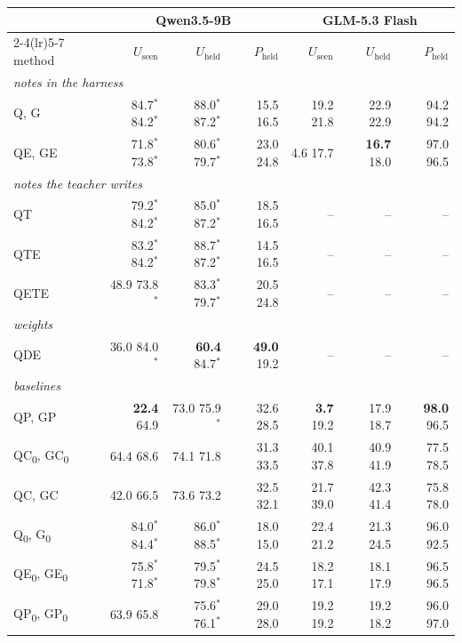 \begin{tabular}{lrrrrrr}
\toprule
 & \multicolumn{3}{c}{Qwen3.5-9B} & \multicolumn{3}{c}{GLM-5.3 Flash} \\
\cmidrule(lr){2-4}\cmidrule(lr){5-7}
method & $U_{\mathrm{seen}}$ & $U_{\mathrm{held}}$ & $P_{\mathrm{held}}$ & $U_{\mathrm{seen}}$ & $U_{\mathrm{held}}$ & $P_{\mathrm{held}}$ \\
\midrule
\multicolumn{7}{l}{\emph{notes in the harness}} \\
Q, G & 84.7$^{*}$ {\tiny 84.2$^{*}$} & 88.0$^{*}$ {\tiny 87.2$^{*}$} & 15.5 {\tiny 16.5} & 19.2 {\tiny 21.8} & 22.9 {\tiny 22.9} & 94.2 {\tiny 94.2} \\
QE, GE & 71.8$^{*}$ {\tiny 73.8$^{*}$} & 80.6$^{*}$ {\tiny 79.7$^{*}$} & 23.0 {\tiny 24.8} & 4.6 {\tiny 17.7} & \textbf{16.7} {\tiny 18.0} & 97.0 {\tiny 96.5} \\
\midrule
\multicolumn{7}{l}{\emph{notes the teacher writes}} \\
QT & 79.2$^{*}$ {\tiny 84.2$^{*}$} & 85.0$^{*}$ {\tiny 87.2$^{*}$} & 18.5 {\tiny 16.5} & -- & -- & -- \\
QTE & 83.2$^{*}$ {\tiny 84.2$^{*}$} & 88.7$^{*}$ {\tiny 87.2$^{*}$} & 14.5 {\tiny 16.5} & -- & -- & -- \\
QETE & 48.9 {\tiny 73.8$^{*}$} & 83.3$^{*}$ {\tiny 79.7$^{*}$} & 20.5 {\tiny 24.8} & -- & -- & -- \\
\midrule
\multicolumn{7}{l}{\emph{weights}} \\
QDE & 36.0 {\tiny 84.0$^{*}$} & \textbf{60.4} {\tiny 84.7$^{*}$} & \textbf{49.0} {\tiny 19.2} & -- & -- & -- \\
\midrule
\multicolumn{7}{l}{\emph{baselines}} \\
QP, GP & \textbf{22.4} {\tiny 64.9} & 73.0 {\tiny 75.9$^{*}$} & 32.6 {\tiny 28.5} & \textbf{3.7} {\tiny 19.2} & 17.9 {\tiny 18.7} & \textbf{98.0} {\tiny 96.5} \\
QC\textsubscript{0}, GC\textsubscript{0} & 64.4 {\tiny 68.6} & 74.1 {\tiny 71.8} & 31.3 {\tiny 33.5} & 40.1 {\tiny 37.8} & 40.9 {\tiny 41.9} & 77.5 {\tiny 78.5} \\
QC, GC & 42.0 {\tiny 66.5} & 73.6 {\tiny 73.2} & 32.5 {\tiny 32.1} & 21.7 {\tiny 39.0} & 42.3 {\tiny 41.4} & 75.8 {\tiny 78.0} \\
Q\textsubscript{0}, G\textsubscript{0} & 84.0$^{*}$ {\tiny 84.4$^{*}$} & 86.0$^{*}$ {\tiny 88.5$^{*}$} & 18.0 {\tiny 15.0} & 22.4 {\tiny 21.2} & 21.3 {\tiny 24.5} & 96.0 {\tiny 92.5} \\
QE\textsubscript{0}, GE\textsubscript{0} & 75.8$^{*}$ {\tiny 71.8$^{*}$} & 79.5$^{*}$ {\tiny 79.8$^{*}$} & 24.5 {\tiny 25.0} & 18.2 {\tiny 17.1} & 18.1 {\tiny 17.9} & 96.5 {\tiny 96.5} \\
QP\textsubscript{0}, GP\textsubscript{0} & 63.9 {\tiny 65.8} & 75.6$^{*}$ {\tiny 76.1$^{*}$} & 29.0 {\tiny 28.0} & 19.2 {\tiny 19.2} & 19.2 {\tiny 18.2} & 96.0 {\tiny 97.0} \\
\bottomrule
\end{tabular}

